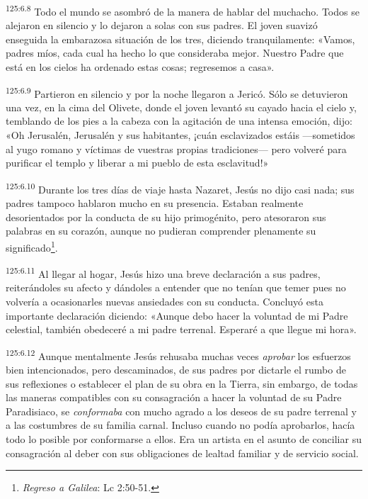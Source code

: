 \par
\textsuperscript{125:6.8} Todo el mundo se asombró de la manera de hablar del muchacho. Todos se alejaron en silencio y lo dejaron a solas con sus padres. El joven suavizó enseguida la embarazosa situación de los tres, diciendo tranquilamente: «Vamos, padres míos, cada cual ha hecho lo que consideraba mejor. Nuestro Padre que está en los cielos ha ordenado estas cosas; regresemos a casa».

\par
\textsuperscript{125:6.9} Partieron en silencio y por la noche llegaron a Jericó. Sólo se detuvieron una vez, en la cima del Olivete, donde el joven levantó su cayado hacia el cielo y, temblando de los pies a la cabeza con la agitación de una intensa emoción, dijo: «Oh Jerusalén, Jerusalén y sus habitantes, ¡cuán esclavizados estáis ---sometidos al yugo romano y víctimas de vuestras propias tradiciones--- pero volveré para purificar el templo y liberar a mi pueblo de esta esclavitud!»

\par
\textsuperscript{125:6.10} Durante los tres días de viaje hasta Nazaret, Jesús no dijo casi nada; sus padres tampoco hablaron mucho en su presencia. Estaban realmente desorientados por la conducta de su hijo primogénito, pero atesoraron sus palabras en su corazón, aunque no pudieran comprender plenamente su significado\footnote{\textit{Regreso a Galilea}: Lc 2:50-51.}.

\par
\textsuperscript{125:6.11} Al llegar al hogar, Jesús hizo una breve declaración a sus padres, reiterándoles su afecto y dándoles a entender que no tenían que temer pues no volvería a ocasionarles nuevas ansiedades con su conducta. Concluyó esta importante declaración diciendo: «Aunque debo hacer la voluntad de mi Padre celestial, también obedeceré a mi padre terrenal. Esperaré a que llegue mi hora».

\par
\textsuperscript{125:6.12} Aunque mentalmente Jesús rehusaba muchas veces \textit{aprobar} los esfuerzos bien intencionados, pero descaminados, de sus padres por dictarle el rumbo de sus reflexiones o establecer el plan de su obra en la Tierra, sin embargo, de todas las maneras compatibles con su consagración a hacer la voluntad de su Padre Paradisiaco, se \textit{conformaba} con mucho agrado a los deseos de su padre terrenal y a las costumbres de su familia carnal. Incluso cuando no podía aprobarlos, hacía todo lo posible por conformarse a ellos. Era un artista en el asunto de conciliar su consagración al deber con sus obligaciones de lealtad familiar y de servicio social.

